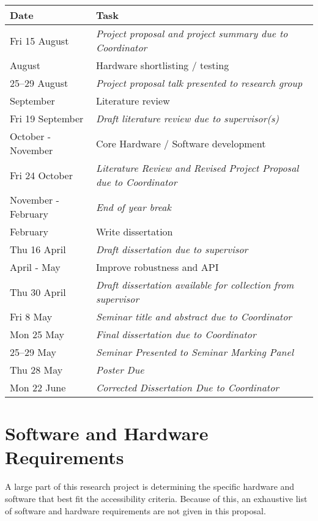 \documentclass[12pt, a4paper]{article}
\begin{document}
\begin{tabular}{ | l | l |}
  \hline
  Date			& Task \\ \hline
  Fri 15 August 	& \emph{Project proposal and project summary due to Coordinator} \\ \hline
  August		& Hardware shortlisting / testing \\  \hline
  25--29 August 	& \emph{Project proposal talk presented to research group} \\ \hline
  September		& Literature review \\ \hline
  Fri 19 September 	& \emph{Draft literature review due to supervisor(s)} \\ \hline
  October - November	& Core Hardware / Software development \\ \hline
  Fri 24 October 	& \emph{Literature Review and Revised Project Proposal due to Coordinator} \\ \hline
  November - February	& \emph{End of year break} \\ \hline
  February		& Write dissertation \\ \hline
  Thu 16 April 		& \emph{Draft dissertation due to supervisor} \\ \hline
  April - May		& Improve robustness and API \\ \hline
  Thu 30 April 		& \emph{Draft dissertation available for collection from supervisor} \\ \hline
  Fri 8 May 		& \emph{Seminar title and abstract due to Coordinator} \\ \hline
  Mon 25 May 		& \emph{Final dissertation due to Coordinator} \\ \hline
  25--29 May		& \emph{Seminar Presented to Seminar Marking Panel} \\ \hline
  Thu 28 May 		& \emph{Poster Due} \\ \hline
  Mon 22 June		& \emph{Corrected Dissertation Due to Coordinator} \\
  \hline
\end{tabular}

\section*{Software and Hardware Requirements}

A large part of this research project is determining the specific hardware and software that best fit the accessibility criteria. Because of this, an exhaustive list of software and hardware requirements are not given in this proposal.
\end{document}
